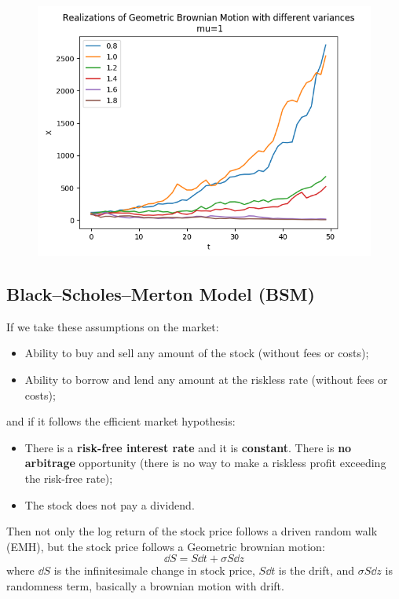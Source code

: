 \begin{figure} [H]
    \centering
    \includegraphics[width=0.75\linewidth]{img/GBM.png}
\end{figure}

\subsection{Black--Scholes--Merton Model (BSM)} 
If we take these assumptions on the market:
\begin{itemize}
    \item Ability to buy and sell any amount of the stock (without fees or costs);
    \item Ability to borrow and lend any amount at the riskless rate (without fees or costs);
    \end{itemize}
    and if it follows the efficient market hypothesis:
    \begin{itemize}
    \item There is a \textbf{risk-free interest rate} and it is \textbf{constant}. There is \textbf{no arbitrage} opportunity (there is no way to make a riskless profit exceeding the risk-free rate);
    \item The stock does not pay a dividend.
    \end{itemize}
Then not only the log return of the stock price follows a driven random walk (EMH), but the stock price follows a Geometric brownian motion:
\begin{equation*}
    \dd S = S \dd t + \sigma S \dd z
\end{equation*}
where $\dd S$ is the infinitesimale change in stock price, $S \dd t$ is the drift, and $\sigma S \dd z$ is randomness term, basically a brownian motion with drift.\\

